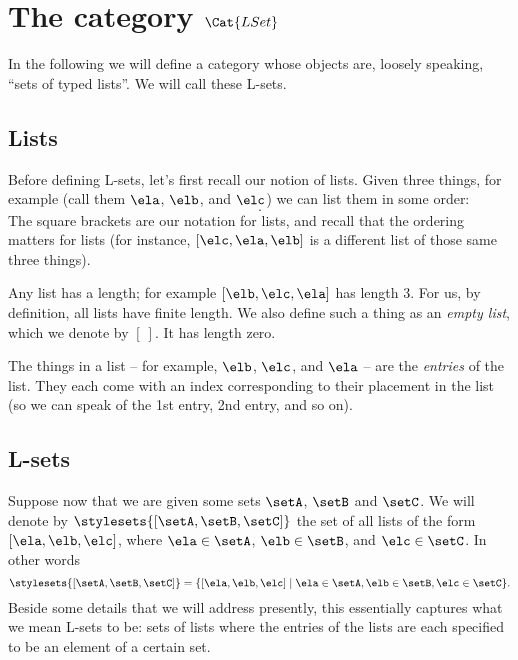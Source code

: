 
\section{The category $\Cat{LSet}$}

In the following we will define a category whose objects are, loosely speaking, ``sets of typed lists''.
We will call these L-sets.

\subsection{Lists}

Before defining L-sets, let's first recall our notion of lists.
Given three things, for example (call them $\ela$, $\elb$, and $\elc$) we can list them in some order:
\begin{equation}
    [\elb, \elc, \ela].
\end{equation}
The square brackets are our notation for lists, and recall that the ordering matters for lists (for instance, $[\elc, \ela, \elb]$ is a different list of those same three things).

Any list has a length; for example $[\elb, \elc, \ela]$ has length 3.
For us, by definition, all lists have finite length.
We also define such a thing as an \emph{empty list}, which we denote by $[ \ ]$.
It has length zero.

The things in a list -- for example, $\elb$, $\elc$, and $\ela$ -- are the \emph{entries} of the list.
They each come with an index corresponding to their placement in the list (so we can speak of the 1st entry, 2nd entry, and so on).

\subsection{L-sets}

Suppose now that we are given some sets $\setA$, $\setB$ and $\setC$.
We will denote by $\stylesets{[\setA, \setB, \setC]}$ the set of all lists of the form $[\ela, \elb, \elc]$, where $\ela \in \setA$, $\elb \in \setB$, and $\elc \in \setC$.
In other words
\begin{equation}
    \stylesets{[\setA, \setB, \setC]} = \{ [\ela, \elb, \elc] \mid \ela \in \setA, \elb \in \setB, \elc \in \setC \}.
\end{equation}
Beside some details that we will address presently, this essentially captures what we mean L-sets to be: sets of lists where the entries of the lists are each specified to be an element of a certain set.

